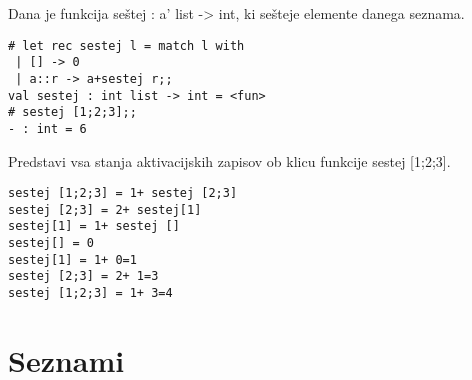 \begin{ex}
Dana je funkcija se\v stej : a' list -> int, ki se\v steje elemente danega seznama.

\begin{lstlisting}
# let rec sestej l = match l with
 | [] -> 0
 | a::r -> a+sestej r;; 
val sestej : int list -> int = <fun> 
# sestej [1;2;3];; 
- : int = 6 

\end{lstlisting}
Predstavi vsa stanja aktivacijskih zapisov ob klicu funkcije sestej [1;2;3].

\begin{sol}
\begin{lstlisting}
sestej [1;2;3] = 1+ sestej [2;3]
sestej [2;3] = 2+ sestej[1]
sestej[1] = 1+ sestej []
sestej[] = 0
sestej[1] = 1+ 0=1
sestej [2;3] = 2+ 1=3
sestej [1;2;3] = 1+ 3=4
\end{lstlisting}
\end{sol}
\end{ex}



\section{Seznami}


